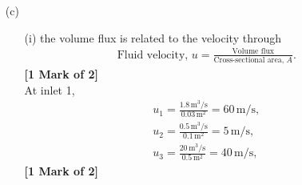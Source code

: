 \documentclass[12pt,twoside]{report}
\begin{document}
\begin{description}
\begin{itemize}
\item[(c)]
\begin{itemize}
\item[(i)] the volume flux is related to the velocity through
\begin{align*}
 \mbox{Fluid velocity, } u = \frac{\mbox{Volume flux}}{\mbox{Cross-sectional area, } A}.
\end{align*} \hfill \textbf{[1 Mark of 2]} \\
At inlet 1,
\begin{align*}
 u_1 = \frac{1.8\,\mbox{m}^3\mbox{/s}}{0.03\,\mbox{m}^2} = 60\,\mbox{m/s}, \\
 u_2 = \frac{0.5\,\mbox{m}^3\mbox{/s}}{0.1\,\mbox{m}^2} = 5\,\mbox{m/s}, \\
 u_3 = \frac{20\,\mbox{m}^3\mbox{/s}}{0.5\,\mbox{m}^2} = 40\,\mbox{m/s},
\end{align*} \hfill \textbf{[1 Mark of 2]}


\end{itemize}
\end{itemize}
\end{description}
\end{document}

